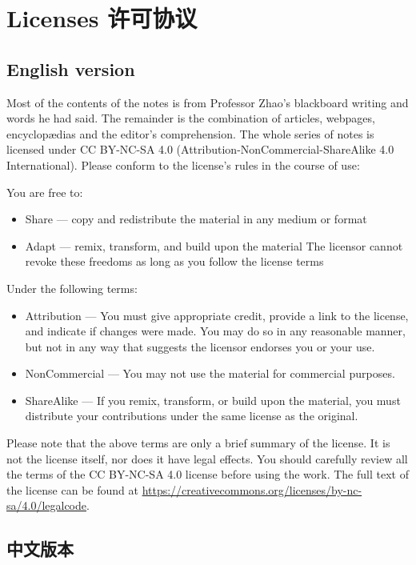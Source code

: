 \chapter{Licenses 许可协议}

\section*{English version}

Most of the contents of the notes is from Professor Zhao's blackboard writing and words he had said. The remainder is the combination of articles, webpages, encyclop\ae{}dias and the editor's comprehension. The whole series of notes is licensed under CC BY-NC-SA 4.0 (Attribution-NonCommercial-ShareAlike 4.0 International). Please conform to the license's rules in the course of use:

You are free to:
\begin{itemize}
    \item Share --- copy and redistribute the material in any medium or format
    \item Adapt --- remix, transform, and build upon the material
    The licensor cannot revoke these freedoms as long as you follow the license terms
\end{itemize}

Under the following terms:
\begin{itemize}
    \item Attribution --- You must give appropriate credit, provide a link to the license, and indicate if changes were made. You may do so in any reasonable manner, but not in any way that suggests the licensor endorses you or your use.
    \item NonCommercial --- You may not use the material for commercial purposes.
    \item ShareAlike --- If you remix, transform, or build upon the material, you must distribute your contributions under the same license as the original.
\end{itemize}

Please note that the above terms are only a brief summary of the license. It is not the license itself, nor does it have legal effects. You should carefully review all the terms of the CC BY-NC-SA 4.0 license before using the work. The full text of the license can be found at \url{https://creativecommons.org/licenses/by-nc-sa/4.0/legalcode}.

\section*{中文版本}

